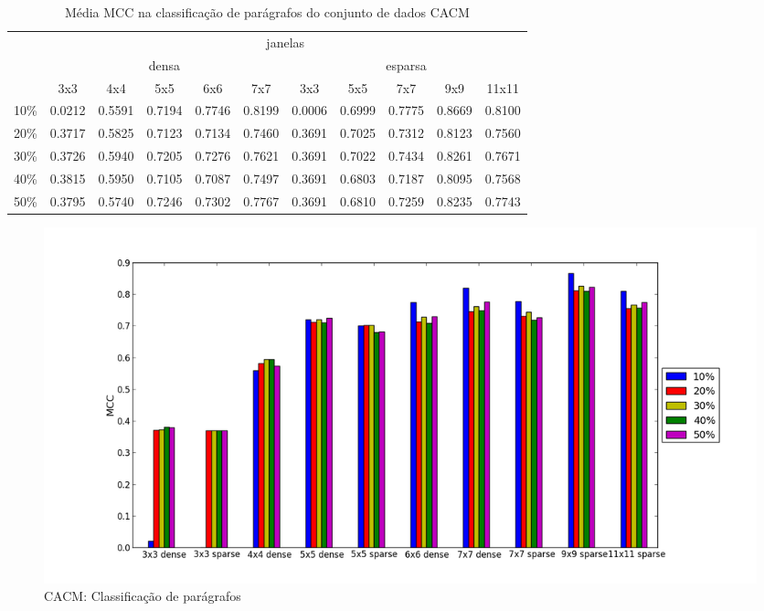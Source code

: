 \documentclass[a4paper,11pt]{article}
\begin{document}
  \begin{center}
    \begin{table}[p]
      \caption{Média MCC na classificação de parágrafos do conjunto de dados CACM}
      \begin{tabular}{ l | c c c c c || c c c c c | }
        \cline{2-11}
        & \multicolumn{10}{|c|}{janelas} \\
        \cline{2-11}
        & \multicolumn{5}{c||}{densa} & \multicolumn{5}{c|}{esparsa} \\
        \cline{2-11}
        & 3x3 & 4x4 & 5x5 & 6x6 & 7x7 & 3x3 & 5x5 & 7x7 & 9x9 & 11x11 \\
        \hline
        \multicolumn{1}{|l|}{10\%}& 0.0212& 0.5591& 0.7194& 0.7746& 0.8199& 0.0006& 0.6999& 0.7775& 0.8669& 0.8100\\
        \multicolumn{1}{|l|}{20\%}& 0.3717& 0.5825& 0.7123& 0.7134& 0.7460& 0.3691& 0.7025& 0.7312& 0.8123& 0.7560\\
        \multicolumn{1}{|l|}{30\%}& 0.3726& 0.5940& 0.7205& 0.7276& 0.7621& 0.3691& 0.7022& 0.7434& 0.8261& 0.7671\\
        \multicolumn{1}{|l|}{40\%}& 0.3815& 0.5950& 0.7105& 0.7087& 0.7497& 0.3691& 0.6803& 0.7187& 0.8095& 0.7568\\
        \multicolumn{1}{|l|}{50\%}& 0.3795& 0.5740& 0.7246& 0.7302& 0.7767& 0.3691& 0.6810& 0.7259& 0.8235& 0.7743\\
        \hline  
      \end{tabular}
    \end{table}
  \end{center}

  \begin{figure}[p]
    \centerline{\includegraphics[width=1.2\textwidth]{assets/experiment_charts/cacm_TextRegion_paragraph_mcc.png}}
    \caption{CACM: Classificação de parágrafos}
    \label{fig:cacm_TextRegion_paragraph_mcc}
  \end{figure}
\end{document}
